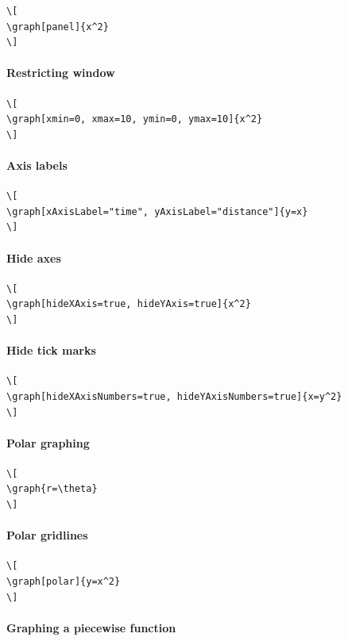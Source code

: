 \documentclass{ximera}
\begin{document}
  
\begin{verbatim}
\[
\graph[panel]{x^2}
\]
\end{verbatim}
\paragraph{Restricting window}

  
\begin{verbatim}
\[
\graph[xmin=0, xmax=10, ymin=0, ymax=10]{x^2}
\]
\end{verbatim}
\paragraph{Axis labels}

  
\begin{verbatim}
\[
\graph[xAxisLabel="time", yAxisLabel="distance"]{y=x}
\]
\end{verbatim}
\paragraph{Hide axes}

  
\begin{verbatim}
\[
\graph[hideXAxis=true, hideYAxis=true]{x^2}
\]
\end{verbatim}
\paragraph{Hide tick marks}

  
\begin{verbatim}
\[
\graph[hideXAxisNumbers=true, hideYAxisNumbers=true]{x=y^2}
\]
\end{verbatim}
\paragraph{Polar graphing}

  
\begin{verbatim}
\[
\graph{r=\theta}
\]
\end{verbatim}
\paragraph{Polar gridlines}


\begin{verbatim}
\[
\graph[polar]{y=x^2}
\]
\end{verbatim}
\paragraph{Graphing a piecewise function}
\end{document}
